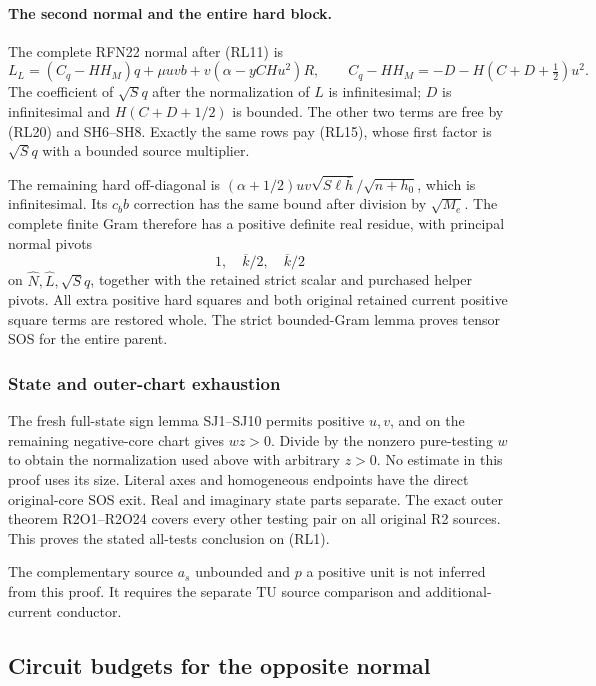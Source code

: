 \paragraph{The second normal and the entire hard block.}
The complete RFN22 normal after (RL11) is
\[
 L_L=(C_q-HH_M)q+\mu uvb+v(\alpha-yCHu^2)R,\qquad
 C_q-HH_M=-D-H(C+D+\tfrac12)u^2 .                      \tag{RL23}
\]
The coefficient of \(\sqrt S q\) after the normalization
of \(L\) is infinitesimal; \(D\) is infinitesimal and
\(H(C+D+1/2)\) is bounded.
The other two terms are free by (RL20) and SH6--SH8.
Exactly the same rows pay (RL15), whose first factor is
\(\sqrt S q\) with a bounded source multiplier.

The remaining hard off-diagonal is
\((\alpha+1/2)uv\sqrt{S\ell\bar h}/\sqrt{n+h_0}\),
which is infinitesimal.  Its \(c_b b\) correction has the
same bound after division by \(\sqrt{M_e}\).
The complete finite Gram therefore has a positive definite
real residue, with principal normal pivots
\[
                   1,\quad\overline k/2,\quad\overline k/2
                                                               \tag{RL24}
\]
on \(\widehat N,\widehat L,\sqrt S q\), together with the
retained strict scalar and purchased helper pivots.
All extra positive hard squares and both original retained
current positive square terms are restored whole.  The strict bounded-Gram
lemma proves tensor SOS for the entire parent.

\subsubsection*{State and outer-chart exhaustion}

The fresh full-state sign lemma SJ1--SJ10 permits positive
\(u,v\), and on the remaining negative-core chart gives
\(wz>0\).  Divide by the nonzero pure-testing \(w\) to obtain
the normalization used above with arbitrary \(z>0\).
No estimate in this proof uses its size.  Literal axes and
homogeneous endpoints have the direct original-core SOS exit.
Real and imaginary state parts separate.
The exact outer theorem R2O1--R2O24 covers every other testing
pair on all original R2 sources.  This proves the stated
all-tests conclusion on (RL1).

The complementary source \(a_s\) unbounded and \(p\) a positive
unit is not inferred from this proof.  It requires the separate
TU source comparison and additional-current conductor.

\subsection{Circuit budgets for the opposite normal}
\label{component:p09b2107cc05e}


